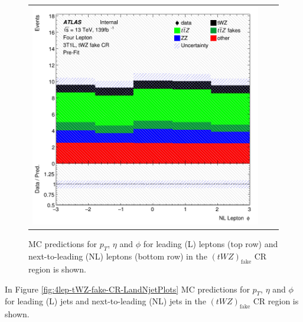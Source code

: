 \begin{figure}[htbp]
\begin{tabular}{ccc}
    \includegraphics[width=.3\textwidth]{figures/PreFitPlots/lep4_tWZ_3T1L_NL_lepton_phi.png} \\

  \end{tabular}
    \caption{MC predictions for $p_{T}$, $\eta$ and $\phi$ for leading (L) leptons (top row) and next-to-leading (NL) leptons (bottom row) in the $(tWZ)_{\text{fake}}$ CR region  is shown.}
  \label{fig:4lep-tWZ-fake-CR-leptonPlots}
\end{figure}

In Figure \ref{fig:4lep-tWZ-fake-CR-LandNjetPlots} MC predictions for $p_{T}$, $\eta$ and $\phi$ for leading (L) jets and next-to-leading (NL) jets in the $(tWZ)_{\text{fake}}$ CR region is shown.

